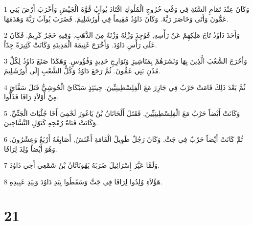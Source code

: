 \par 1 وَكَانَ عِنْدَ تَمَامِ السَّنَةِ فِي وَقْتِ خُرُوجِ الْمُلُوكِ اقْتَادَ يُوآبُ قُوَّةَ الْجَيْشِ وَأَخْرَبَ أَرْضَ بَنِي عَمُّونَ وَأَتَى وَحَاصَرَ رَبَّةَ. وَكَانَ دَاوُدُ مُقِيماً فِي أُورُشَلِيمَ. فَضَرَبَ يُوآبُ رَبَّةَ وَهَدَمَهَا.
\par 2 وَأَخَذَ دَاوُدُ تَاجَ مَلِكِهِمْ عَنْ رَأْسِهِ, فَوُجِدَ وَزْنُهُ وَزْنَةً مِنَ الذَّهَبِ, وَفِيهِ حَجَرٌ كَرِيمٌ. فَكَانَ عَلَى رَأْسِ دَاوُدَ. وَأَخْرَجَ غَنِيمَةَ الْمَدِينَةِ وَكَانَتْ كَثِيرَةً جِدّاً.
\par 3 وَأَخْرَجَ الشَّعْبَ الَّذِينَ بِهَا وَنَشَرَهُمْ بِمَنَاشِيرَِ وَنَوَارِجِ حَدِيدٍ وَفُؤُوسٍ. وَهَكَذَا صَنَعَ دَاوُدُ لِكُلِّ مُدُنِ بَنِي عَمُّونَ. ثُمَّ رَجَعَ دَاوُدُ وَكُلُّ الشَّعْبِ إِلَى أُورُشَلِيمَ.
\par 4 ثُمَّ بَعْدَ ذَلِكَ قَامَتْ حَرْبٌ فِي جَازِرَ مَعَ الْفِلِسْطِينِيِّينَ. حِينَئِذٍ سَبْكَايُ الْحُوشِيُّ قَتَلَ سَفَّايَ مِنْ أَوْلاَدِ رَافَا فَذَلُّوا.
\par 5 وَكَانَتْ أَيْضاً حَرْبٌ مَعَ الْفِلِسْطِينِيِّينَ, فَقَتَلَ أَلْحَانَانُ بْنُ يَاعُورَ لَحْمِيَ أَخَا جُلْيَاتَ الْجَتِّيِّ. وَكَانَتْ قَنَاةُ رُمْحِهِ كَنَوْلِ النَّسَّاجِينَ.
\par 6 ثُمَّ كَانَتْ أَيْضاً حَرْبٌ فِي جَتَّ, وَكَانَ رَجُلٌ طَوِيلُ الْقَامَةِ أَعْنَشُ, أَصَابِعُهُ أَرْبَعٌ وَعِشْرُونَ, وَهُوَ أَيْضاً وُلِدَ لِرَافَا.
\par 7 وَلَمَّا عَيَّرَ إِسْرَائِيلَ ضَرَبَهُ يَهُونَاثَانُ بْنُ شَمْعِي أَخِي دَاوُدَ.
\par 8 هَؤُلاَءِ وُلِدُوا لِرَافَا فِي جَتَّ وَسَقَطُوا بِيَدِ دَاوُدَ وَبِيَدِ عَبِيدِهِ.

\chapter{21}

